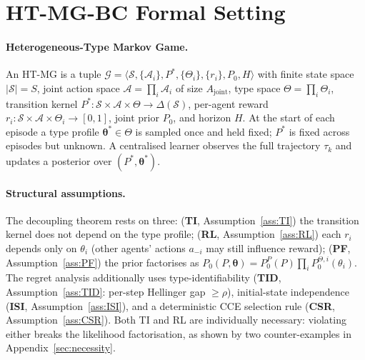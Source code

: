 \section{HT-MG-BC Formal Setting}
\label{sec:setting-app}

\paragraph{Heterogeneous-Type Markov Game.}
An HT-MG is a tuple
$\mathcal{G} = \langle \mathcal{S}, \{\mathcal{A}_i\}, P^*, \{\Theta_i\}, \{r_i\}, P_0, H \rangle$
with finite state space $|\mathcal S|=S$, joint action space $\mathcal A=\prod_i \mathcal A_i$ of size $A_{\mathrm{joint}}$, type space $\Theta=\prod_i \Theta_i$, transition kernel $P^*\!:\!\mathcal S\!\times\!\mathcal A\!\times\!\Theta\to\Delta(\mathcal S)$, per-agent reward $r_i\!:\!\mathcal S\!\times\!\mathcal A\!\times\!\Theta_i\!\to\![0,1]$, joint prior $P_0$, and horizon $H$. At the start of each episode a type profile $\boldsymbol\theta^* \in \Theta$ is sampled once and held fixed; $P^*$ is fixed across episodes but unknown. A centralised learner observes the full trajectory $\tau_k$ and updates a posterior over $(P^*, \boldsymbol\theta^*)$.

\paragraph{Structural assumptions.} The decoupling theorem rests on three:
(\textbf{TI}, Assumption~\ref{ass:TI}) the transition kernel does not depend on the type profile;
(\textbf{RL}, Assumption~\ref{ass:RL}) each $r_i$ depends only on $\theta_i$ (other agents' actions $a_{-i}$ may still influence reward);
(\textbf{PF}, Assumption~\ref{ass:PF}) the prior factorises as $P_0(P,\boldsymbol\theta)=P_0^P(P)\prod_i P_0^{\Theta,i}(\theta_i)$.
The regret analysis additionally uses type-identifiability (\textbf{TID}, Assumption~\ref{ass:TID}: per-step Hellinger gap $\geq\rho$), initial-state independence (\textbf{ISI}, Assumption~\ref{ass:ISI}), and a deterministic CCE selection rule (\textbf{CSR}, Assumption~\ref{ass:CSR}). Both TI and RL are individually necessary: violating either breaks the likelihood factorisation, as shown by two counter-examples in Appendix~\ref{sec:necessity}.

